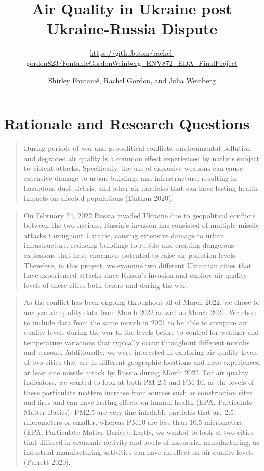 \documentclass[
  12pt,
]{article}
\title{Air Quality in Ukraine post Ukraine-Russia Dispute}
\subtitle{\url{https://github.com/rachel-gordon823/FontanieGordonWeinberg_ENV872_EDA_FinalProject}}
\author{Shirley Fontanié, Rachel Gordon, and Julia Weinberg}
\date{}
\begin{document}
\maketitle

\newpage
\tableofcontents
\newpage
\listoftables 
\newpage 
\listoffigures 
\newpage

\hypertarget{rationale-and-research-questions}{%
\section{Rationale and Research
Questions}\label{rationale-and-research-questions}}

\begin{quote}
During periods of war and geopolitical conflicts, environmental
pollution and degraded air quality is a common effect experienced by
nations subject to violent attacks. Specifically, the use of explosive
weapons can cause extensive damage to urban buildings and
infrastructure, resulting in hazardous dust, debris, and other air
particles that can have lasting health impacts on affected populations
(Dathan 2020).
\end{quote}

\begin{quote}
On February 24, 2022 Russia invaded Ukraine due to geopolitical
conflicts between the two nations. Russia's invasion has consisted of
multiple missile attacks throughout Ukraine, causing extensive damage to
urban infrastructure, reducing buildings to rubble and creating
dangerous explosions that have enormous potential to raise air pollution
levels. Therefore, in this project, we examine two different Ukrainian
cities that have experienced attacks since Russia's invasion and explore
air quality levels of these cities both before and during the war.
\end{quote}

\begin{quote}
As the conflict has been ongoing throughout all of March 2022, we chose
to analyze air quality data from March 2022 as well as March 2021. We
chose to include data from the same month in 2021 to be able to compare
air quality levels during the war to the levels before to control for
weather and temperature variations that typically occur throughout
different months and seasons. Additionally, we were interested in
exploring air quality levels of two cities that are in different
geographic locations and have experienced at least one missile attack by
Russia during March 2022. For air quality indicators, we wanted to look
at both PM 2.5 and PM 10, as the levels of these particulate matters
increase from sources such as construction sites and fires and can have
lasting effects on human health (EPA, Particulate Matter Basics). PM2.5
are very fine inhalable particles that are 2.5 micrometers or smaller,
whereas PM10 are less than 10.5 micrometers (EPA, Particulate Matter
Basics). Lastly, we wanted to look at two cities that differed in
economic activity and levels of industrial manufacturing, as industrial
manufacturing activities can have an effect on air quality levels
(Parrett 2020).
\end{quote}
\end{document}
